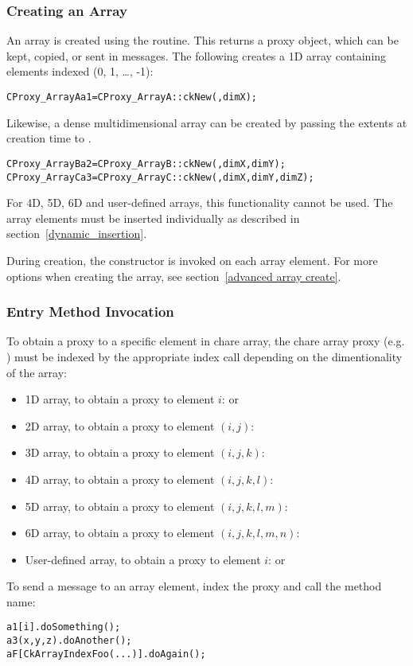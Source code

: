 \subsubsection{Creating an Array}
\label{basic array creation}

An array is created using the  routine. This returns a
proxy object, which can be kept, copied, or sent in messages. The following
creates a 1D array containing elements indexed (0, 1, \ldots,
-1):
%
\begin{alltt}
CProxy_ArrayA a1 = CProxy_ArrayA::ckNew(, dimX);
\end{alltt}
%
Likewise, a dense multidimensional array can be created by passing the extents
at creation time to .
%
\begin{alltt}
CProxy_ArrayB a2 = CProxy_ArrayB::ckNew(, dimX, dimY);
CProxy_ArrayC a3 = CProxy_ArrayC::ckNew(, dimX, dimY, dimZ);
\end{alltt}
%
For 4D, 5D, 6D and user-defined arrays, this functionality cannot be used.  The
array elements must be inserted individually as described in
section~\ref{dynamic_insertion}.

During creation, the constructor is invoked on each array element. For more
options when creating the array, see section~\ref{advanced array create}.

\subsubsection{Entry Method Invocation}

To obtain a proxy to a specific element in chare array, the chare array proxy
(e.g. ) must be indexed by the appropriate index call depending
on the dimentionality of the array:
%
\begin{itemize}
\item 1D array, to obtain a proxy to element $i$:  or
\item 2D array, to obtain a proxy to element $(i,j)$: 
\item 3D array, to obtain a proxy to element $(i,j,k)$: 
\item 4D array, to obtain a proxy to element $(i,j,k,l)$:
\item 5D array, to obtain a proxy to element $(i,j,k,l,m)$:
\item 6D array, to obtain a proxy to element $(i,j,k,l,m,n)$:
\item User-defined array, to obtain a proxy to element $i$: 
  or 
\end{itemize}
%
To send a  message to an array element, index the proxy
and call the method name:
%
\begin{alltt}
a1[i].doSomething();
a3(x,y,z).doAnother();
aF[CkArrayIndexFoo(...)].doAgain();
\end{alltt}

